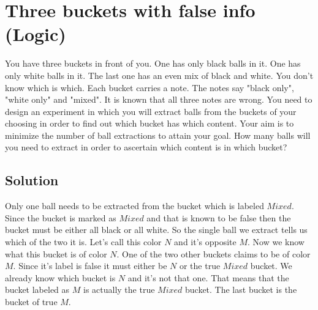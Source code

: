 \section {Three buckets with false info (Logic)}
You have three buckets in front of you. One has only black balls in it. One has only white balls in it. The last one has an even mix of black and white. You don't know which is which. Each bucket carries a note. The notes say "black only", "white only" and "mixed". It is known that all three notes are wrong. You need to design an experiment in which you will extract balls from the buckets of your choosing in order to find out which bucket has which content. Your aim is to minimize the number of ball extractions to attain your goal. How many balls will you need to extract in order to ascertain which content is in which bucket?

\subsection{Solution}
Only one ball needs to be extracted from the bucket which is labeled $Mixed$. Since the bucket is marked as $Mixed$ and that is known to be false then the bucket must be either all black or all white. So the single ball we extract tells us which of the two it is. Let's call this color $N$ and it's opposite $M$. Now we know what this bucket is of color $N$. One of the two other buckets claims to be of color $M$. Since it's label is false it must either be $N$ or the true $Mixed$ bucket. We already know which bucket is $N$ and it's not that one. That means that the bucket labeled as $M$ is actually the true $Mixed$ bucket. The last bucket is the bucket of true $M$.
